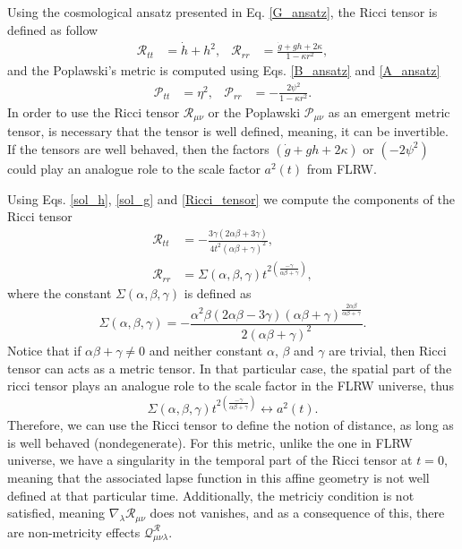 Using the cosmological ansatz presented in Eq. \eqref{G_ansatz}, the Ricci tensor is 
defined as follow
\begin{align}
    \label{Ricci_tensor}
    \mathcal{R}_{tt} & = \dot{h} + h^2, & \mathcal{R}_{rr} & = \frac{\dot{g} + gh + 2\kappa}{1 - \kappa r^2},
\end{align}
and the Poplawski's metric is computed using Eqs. \eqref{B_ansatz} and \eqref{A_ansatz}
\begin{align}
    \label{Pop_tensor}
    \mathcal{P}_{tt} & = \eta^2, & \mathcal{P}_{rr} & = -\frac{2\psi^2}{1 - \kappa r^2}.
\end{align}
In order to use the Ricci tensor $\mathcal{R}_{\mu\nu}$ or the Poplawski $\mathcal{P}_{\mu\nu}$ as an
emergent metric tensor, is necessary that the tensor is well defined, meaning, it can be invertible. If the
tensors are well behaved, then the factors $\left(\dot{g} + gh + 2\kappa\right)$ or $\left(-2\psi^2\right)$ 
could play an analogue role to the scale factor $a^2(t)$ from FLRW.

Using Eqs. \eqref{sol_h}, \eqref{sol_g} and \eqref{Ricci_tensor} we compute the components 
of the Ricci tensor
\begin{align}
    \mathcal{R}_{tt} & = -\frac{3\gamma\left(2\alpha\beta + 3\gamma\right)}{4t^2\left(\alpha\beta + \gamma\right)^2}, \label{R_temporal} \\
    \mathcal{R}_{rr} & = \Sigma\left(\alpha,\beta,\gamma\right)t^{2\left(\frac{-\gamma}{\alpha\beta + \gamma}\right)} \label{R_spatial},
\end{align}
where the constant $\Sigma\left(\alpha,\beta,\gamma\right)$ is defined as
\begin{equation}
    \Sigma\left(\alpha,\beta,\gamma\right) = -\frac{\alpha^2\beta\left(2\alpha\beta - 3\gamma\right)\left(\alpha\beta + \gamma\right)^{\frac{2\alpha\beta}{\alpha\beta + \gamma}}}{2\left(\alpha\beta +\gamma\right)^2}.
\end{equation}
Notice that if $\alpha\beta + \gamma \neq 0$ and neither constant $\alpha$, $\beta$
and $\gamma$ are trivial, then Ricci tensor can acts as a metric tensor. In that 
particular case, the spatial part of the ricci tensor plays an analogue role to 
the scale factor in the FLRW universe, thus
\begin{equation}
    \Sigma\left(\alpha,\beta,\gamma\right)t^{2\left(\frac{-\gamma}{\alpha\beta + \gamma}\right)} \longleftrightarrow a^2(t).
\end{equation}
Therefore, we can use the Ricci tensor to define the notion of distance, as 
long as is well behaved (nondegenerate). For this metric, unlike the one in FLRW 
universe, we have a singularity in the temporal part of the Ricci tensor at $t = 0$, 
meaning that the associated lapse function in this affine geometry is not well 
defined at that particular time. Additionally, the metriciy condition is not satisfied, 
meaning $\nabla_\lambda \mathcal{R}_{\mu\nu}$ does  not vanishes, and as a consequence 
of this, there are non-metricity effects $\mathcal{Q}^{\mathcal{R}}_{\mu\nu\lambda}$.


